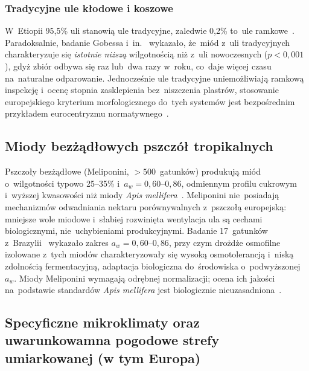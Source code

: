\subsubsection{Tradycyjne ule kłodowe i koszowe}

W~Etiopii 95,5\% uli stanowią ule tradycyjne, zaledwie 0,2\%
to~ule ramkowe~\cite{ethaau2007}. Paradoksalnie, badanie Gobessa
i~in.~\cite{sciendo2012} wykazało, że~miód z~uli tradycyjnych
charakteryzuje się \emph{istotnie niższą} wilgotnością niż
z~uli nowoczesnych ($p < 0{,}001$), gdyż zbiór odbywa się raz
lub~dwa razy w~roku, co~daje więcej czasu na~naturalne odparowanie.
Jednocześnie ule tradycyjne uniemożliwiają ramkową inspekcję
i~ocenę stopnia zasklepienia bez~niszczenia plastrów, stosowanie
europejskiego kryterium morfologicznego do~tych systemów jest
bezpośrednim przykładem eurocentryzmu normatywnego~\cite{tadele2025}.

\subsection{Miody bezżądłowych pszczół tropikalnych}

Pszczoły bezżądłowe (Meliponini, $>500$~gatunków) produkują miód
o~wilgotności typowo 25--35\% i~$a_w = 0{,}60$--$0{,}86$,
odmiennym profilu cukrowym i~wyższej kwasowości niż miody
\textit{Apis mellifera}~\cite{stinglessyeastbrazil2021,stinglesswjava2024}.
Meliponini nie~posiadają mechanizmów odwadniania nektaru
porównywalnych z~pszczołą europejską: mniejsze wole miodowe
i~słabiej rozwinięta wentylacja ula są cechami biologicznymi,
nie~uchybieniami produkcyjnymi. Badanie 17~gatunków
z~Brazylii~\cite{stinglessyeastbrazil2021} wykazało zakres
$a_w = 0{,}60$--$0{,}86$, przy czym drożdże osmofilne izolowane
z~tych miodów charakteryzowały się wysoką osmotolerancją
i~niską zdolnością fermentacyjną, adaptacja biologiczna
do~środowiska o~podwyższonej $a_w$. Miody Meliponini
wymagają odrębnej normalizacji; ocena ich jakości na~podstawie
standardów \textit{Apis mellifera} jest biologicznie
nieuzasadniona~\cite{stinglessyeastbrazil2021,stinglesswjava2024}.

\subsection{Specyficzne mikroklimaty oraz uwarunkowamna pogodowe strefy umiarkowanej (w tym Europa)} 

